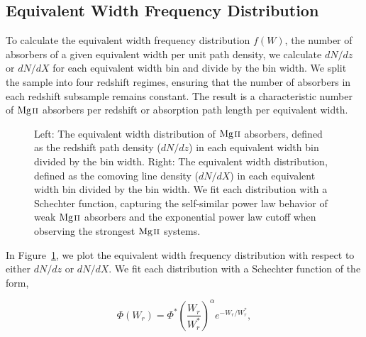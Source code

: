 \documentclass[iop,apj,numberedappendix,appendixfloats,twocolappendix]{emulateapj}
\begin{document}
\subsection{Equivalent Width Frequency Distribution}
\label{sec:ewdistro}

To calculate the equivalent width frequency distribution $f(W)$, the number of absorbers of a given equivalent width per unit path density, we calculate $dN\!/dz$ or $dN\!/dX$ for each equivalent width bin and divide by the bin width. We split the sample into four redshift regimes, ensuring that the number of absorbers in each redshift subsample remains constant. The result is a characteristic number of ${\hbox{{\rm Mg}\kern 0.1em{\sc ii}}}$ absorbers per redshift or absorption path length per equivalent width.

\begin{figure*}[bth]
\caption{Left: The equivalent width distribution of ${\hbox{{\rm Mg}\kern 0.1em{\sc ii}}}$ absorbers, defined as the redshift path density ($dN\!/dz$) in each equivalent width bin divided by the bin width. Right: The equivalent width distribution, defined as the comoving line density ($dN\!/dX$) in each equivalent width bin divided by the bin width. We fit each distribution with a Schechter function, capturing the self-similar power law behavior of weak ${\hbox{{\rm Mg}\kern 0.1em{\sc ii}}}$ absorbers and the exponential power law cutoff when observing the strongest ${\hbox{{\rm Mg}\kern 0.1em{\sc ii}}}$ systems.}
\label{fig:ewdistro}
\end{figure*}

In Figure~\ref{fig:ewdistro}, we plot the equivalent width frequency distribution with respect to either $dN\!/dz$ or $dN\!/dX$. We fit each distribution with a Schechter function of the form,

\begin{equation}
\Phi (W_r) = \Phi^* \left(\frac{W_r}{W_r^*}\right)^{\alpha} e^{-W_r / W_r^*} ,
\label{eqn:schechter}
\end{equation}
\end{document}
